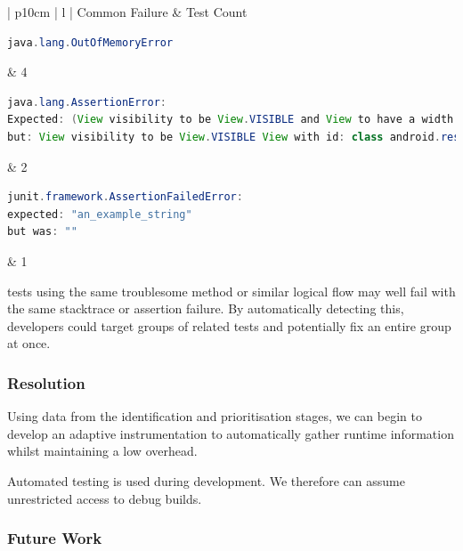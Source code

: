 \begin{center}
    \begin{tabular}{| p{10cm} | l |}
    \hline
    Common Failure & \flaky Test Count \\ \hline
    {\begin{lstlisting}[language=Java, numbers=none]
java.lang.OutOfMemoryError
	\end{lstlisting}}
    & 4 \\ \hline
    {\begin{lstlisting}[language=Java, numbers=none]
java.lang.AssertionError:
Expected: (View visibility to be View.VISIBLE and View to have a width and a height)
but: View visibility to be View.VISIBLE View with id: class android.resources.R$id.anExampleView(1) had a visibility of View.GONE
	\end{lstlisting}}
	& 2 \\ \hline
    {\begin{lstlisting}[language=Java, numbers=none]
junit.framework.AssertionFailedError:
expected: "an_example_string"
but was: ""
	\end{lstlisting}}
	& 1 \\ \hline

    \end{tabular}
\end{center}

\flaky tests using the same troublesome method or similar logical flow may well fail with the same stacktrace or assertion failure. By automatically detecting this, developers could target groups of related tests and potentially fix an entire group at once.


\subsubsection{Resolution}

Using data from the identification and prioritisation stages, we can begin to develop an adaptive instrumentation to automatically gather runtime information whilst maintaining a low overhead.


Automated testing is used during development. We therefore can assume unrestricted access to debug builds.

\subsubsection{Future Work}

